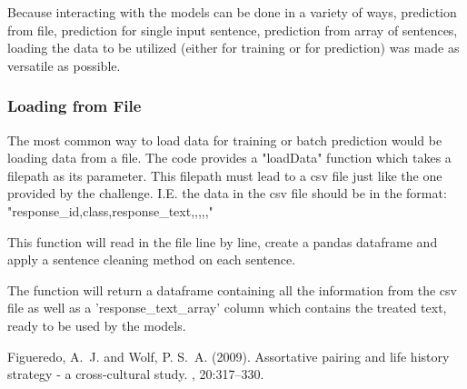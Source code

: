 \documentclass[twoside,twocolumn]{article}
\begin{document}
Because interacting with the models can be done in a variety of ways, prediction from file, prediction for single input sentence,
prediction from array of sentences, loading the data to be utilized (either for training or for prediction) was made as versatile as possible.

\subsubsection{Loading from File}

The most common way to load data for training or batch prediction would be loading data from a file. The code provides a "loadData" function
which takes a filepath as its parameter. This filepath must lead to a csv file just like the one provided by the challenge. I.E. the data in 
the csv file should be in the format: "response_id,class,response_text,,,,,"

This function will read in the file line by line, create a pandas dataframe and apply a sentence cleaning method on each sentence.

The function will return a dataframe containing all the information from the csv file as well as a 'response_text_array' column which contains the
treated text, ready to be used by the models.





\begin{thebibliography}{99} %

Figueredo, A.~J. and Wolf, P. S.~A. (2009).
\newblock Assortative pairing and life history strategy - a cross-cultural
  study.
, 20:317--330.
 
\end{thebibliography}

\end{document}
